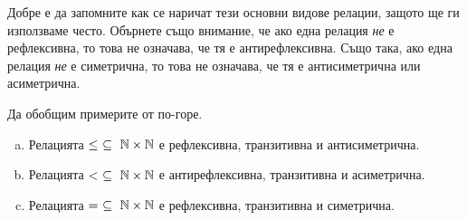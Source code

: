 \begin{remark}
  Добре е да запомните как се наричат тези основни видове релации, защото ще ги използваме често.
  Обърнете също внимание, че ако една релация {\em не} е рефлексивна, то това не означава, че тя е антирефлексивна.
  Също така, ако една релация {\em не} е симетрична, то това не означава, че тя е антисиметрична или асиметрична.
\end{remark}

\begin{example}
  Да обобщим примерите от по-горе.
  \begin{enumerate}[a)]
  \item
    Релацията $\leq\ \subseteq\ \Nat\times\Nat$ е рефлексивна, транзитивна и антисиметрична.
  \item
    Релацията $<\ \subseteq\ \Nat\times\Nat$ е антирефлексивна, транзитивна и асиметрична.
  \item
    Релацията $=\ \subseteq\ \Nat\times\Nat$ е рефлексивна, транзитивна и симетрична.
  \end{enumerate}
\end{example}

